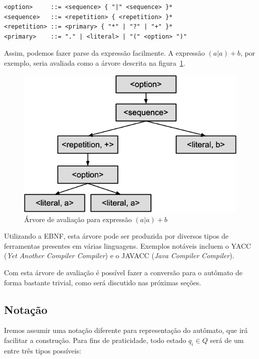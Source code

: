 \documentclass[a4paper,12pt,oneside,onecolumn]{uerj}
\begin{document}
\begin{verbatim}
<option>     ::= <sequence> { "|" <sequence> }*
<sequence>   ::= <repetition> { <repetition> }*
<repetition> ::= <primary> { "*" | "?" | "+" }*
<primary>    ::= "." | <literal> | "(" <option> ")"
\end{verbatim}

Assim, podemos fazer parse da expressão facilmente. A expressão $(a|a)+b$, por exemplo, seria avaliada como a árvore descrita na figura~\ref{fig:aab_parse_tree}.

\begin{figure}[ht]
  \centering
  \includegraphics[scale=0.5]{figures/aab_parse_tree.png}
  \caption{Árvore de avaliação para expressão $(a|a)+b$}
  \label{fig:aab_parse_tree}
\end{figure}

Utilizando a EBNF, esta árvore pode ser produzida por diversos tipos de ferramentas presentes em várias linguagens. Exemplos notáveis incluem o YACC (\emph{Yet Another Compiler Compiler}) e o JAVACC (\emph{Java Compiler Compiler}).

Com esta árvore de avaliação é possível fazer a conversão para o autômato de forma bastante trivial, como será discutido nas próximas seções.

\subsection{Notação}
\label{sec:Notacao}

Iremos assumir uma notação diferente para representação do autômato, que irá facilitar a construção. Para fins de praticidade, todo estado $q_i \in Q$ será de um entre três tipos possíveis:
\end{document}
